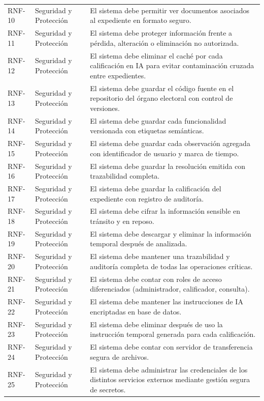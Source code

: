 \documentclass[12pt,a4paper,oneside]{book}
\begin{document}
\begin{longtable}{@{}>{\centering\arraybackslash}p{2cm}
                    >{\centering\arraybackslash}p{3cm}
                    >{\raggedright\arraybackslash}p{10cm}@{}}
RNF-10 & Seguridad y Protección & El sistema debe permitir ver documentos asociados al expediente en formato seguro. \\
RNF-11 & Seguridad y Protección & El sistema debe proteger información frente a pérdida, alteración o eliminación no autorizada. \\
RNF-12 & Seguridad y Protección & El sistema debe eliminar el caché por cada calificación en IA para evitar contaminación cruzada entre expedientes. \\
RNF-13 & Seguridad y Protección & El sistema debe guardar el código fuente en el repositorio del órgano electoral con control de versiones. \\
RNF-14 & Seguridad y Protección & El sistema debe guardar cada funcionalidad versionada con etiquetas semánticas. \\
RNF-15 & Seguridad y Protección & El sistema debe guardar cada observación agregada con identificador de usuario y marca de tiempo. \\
RNF-16 & Seguridad y Protección & El sistema debe guardar la resolución emitida con trazabilidad completa. \\
RNF-17 & Seguridad y Protección & El sistema debe guardar la calificación del expediente con registro de auditoría. \\
RNF-18 & Seguridad y Protección & El sistema debe cifrar la información sensible en tránsito y en reposo. \\
RNF-19 & Seguridad y Protección & El sistema debe descargar y eliminar la información temporal después de analizada. \\
RNF-20 & Seguridad y Protección & El sistema debe mantener una trazabilidad y auditoría completa de todas las operaciones críticas. \\
RNF-21 & Seguridad y Protección & El sistema debe contar con roles de acceso diferenciados (administrador, calificador, consulta). \\
RNF-22 & Seguridad y Protección & El sistema debe mantener las instrucciones de IA encriptadas en base de datos. \\
RNF-23 & Seguridad y Protección & El sistema debe eliminar después de uso la instrucción temporal generada para cada calificación. \\
RNF-24 & Seguridad y Protección & El sistema debe contar con servidor de transferencia segura de archivos. \\
RNF-25 & Seguridad y Protección & El sistema debe administrar las credenciales de los distintos servicios externos mediante gestión segura de secretos. \\

\end{longtable}
\end{document}
